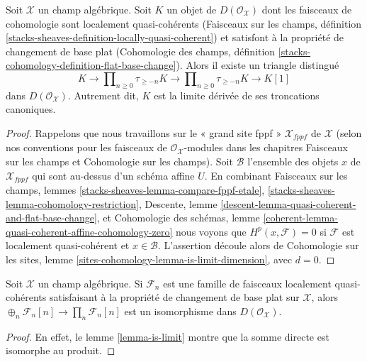 \begin{lemma}
\label{lemma-is-limit}
Soit $\mathcal{X}$ un champ algébrique. Soit $K$ un objet de
$D(\mathcal{O}_\mathcal{X})$ dont les faisceaux de cohomologie sont localement
quasi-cohérents (Faisceaux sur les champs, définition
\ref{stacks-sheaves-definition-locally-quasi-coherent})
et satisfont à la propriété de changement de base plat (Cohomologie des champs,
définition \ref{stacks-cohomology-definition-flat-base-change}).
Alors il existe un triangle distingué
$$
K \to
\prod\nolimits_{n \geq 0} \tau_{\geq -n} K \to
\prod\nolimits_{n \geq 0} \tau_{\geq -n} K \to K[1]
$$
dans $D(\mathcal{O}_\mathcal{X})$. Autrement dit, $K$ est la limite dérivée
de ses troncations canoniques.
\end{lemma}

\begin{proof}
Rappelons que nous travaillons sur le « grand site fppf » $\mathcal{X}_{fppf}$
de $\mathcal{X}$ (selon nos conventions
pour les faisceaux de $\mathcal{O}_\mathcal{X}$-modules dans les chapitres
Faisceaux sur les champs et Cohomologie sur les champs). Soit $\mathcal{B}$ l'ensemble
des objets $x$ de $\mathcal{X}_{fppf}$ qui sont au-dessus d'un schéma affine $U$.
En combinant
Faisceaux sur les champs, lemmes
\ref{stacks-sheaves-lemma-compare-fppf-etale},
\ref{stacks-sheaves-lemma-cohomology-restriction},
Descente, lemme \ref{descent-lemma-quasi-coherent-and-flat-base-change},
et
Cohomologie des schémas, lemme
\ref{coherent-lemma-quasi-coherent-affine-cohomology-zero}
nous voyons que $H^p(x, \mathcal{F}) = 0$ si $\mathcal{F}$ est
localement quasi-cohérent et $x \in \mathcal{B}$.
L'assertion découle alors de
Cohomologie sur les sites, lemme \ref{sites-cohomology-lemma-is-limit-dimension},
avec $d = 0$.
\end{proof}

\begin{lemma}
\label{lemma-sum-is-product}
Soit $\mathcal{X}$ un champ algébrique. Si $\mathcal{F}_n$ est une famille
de faisceaux localement quasi-cohérents satisfaisant à la propriété de changement de base plat sur
$\mathcal{X}$, alors $\oplus_n \mathcal{F}_n[n] \to \prod_n \mathcal{F}_n[n]$
est un isomorphisme dans $D(\mathcal{O}_\mathcal{X})$.
\end{lemma}

\begin{proof}
En effet, le lemme \ref{lemma-is-limit} montre que la somme directe
est isomorphe au produit.
\end{proof}

